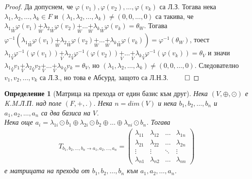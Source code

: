 \documentclass[12pt]{article}
\newtheorem{definition}{Определение}%
\begin{document}
\begin{proof}
Да допуснем, че \(\varphi(v_1), \varphi(v_2), \dots, \varphi(v_k)\) са Л.З.
Тогава нека \(\lambda_1, \lambda_2, \dots, \lambda_k \in F\) и \((\lambda_1, \lambda_2, \dots, \lambda_k) \neq (0, 0, \dots, 0)\)
са такива, че \(\lambda_1 \underset{W}{.} \varphi(v_1) \underset{W}{+} \lambda_2 \underset{W}{.} \varphi(v_2) \underset{W}{+} \dots \underset{W}{+} \lambda_k \underset{W}{.} \varphi(v_k) = \theta_W\).
Тогава \(\varphi^{-1}(\lambda_1 \underset{W}{.} \varphi(v_1) \underset{W}{+} \lambda_2 \underset{W}{.} \varphi(v_2) \underset{W}{+} \dots \underset{W}{+} \lambda_k \underset{W}{.} \varphi(v_k)) = \varphi^{-1}(\theta_W)\),
тоест \(\lambda_1 \underset{V}{.} \varphi^{-1}(\varphi(v_1)) \underset{V}{+} \lambda_2 \underset{V}{.} \varphi^{-1}(\varphi(v_2)) \underset{V}{+} \dots \underset{V}{+} \lambda_k \underset{V}{.} \varphi^{-1}(\varphi(v_k)) = \theta_V\)
и значи \(\lambda_1 \underset{V}{.} v_1 \underset{V}{+} \lambda_2 \underset{V}{.} v_2 \underset{V}{+} \dots \underset{V}{+} \lambda_k \underset{V}{.} v_k = \theta_V\),
но \((\lambda_1, \lambda_2, \dots, \lambda_k) \neq (0, 0, \dots, 0)\).
Следователно \(v_1, v_2, \dots, v_k\) са Л.З., но това е Абсурд, защото са Л.Н.З. \(\qed\)
\end{proof}

\begin{definition}[Матрица на прехода от един базис към друг]
Нека \((V, \oplus, \odot)\) е K.M.Л.П. над поле \((F, +, .)\).
Нека \(n = dim(V)\) и нека
\(b_1, b_2, \dots, b_n\) и \(a_1, a_2, \dots, a_n\) са два базиса на \(V\). \\
Нека още \(a_i = \lambda_{1i} \odot b_1 \oplus \lambda_{2i} \odot b_2 \oplus \dots \oplus \lambda_{ni} \odot b_n\).
Тогава
\begin{align*}
T_{b_1, b_2, \dots, b_n \to a_1, a_2, \dots, a_n}
=
\begin{pmatrix}
    \lambda_{11} & \lambda_{12} & \dots & \lambda_{1n} \\
    \lambda_{21} & \lambda_{22} & \dots & \lambda_{2n} \\
    \vdots    & \vdots  & \ddots & \vdots \\
    \lambda_{n1} & \lambda_{n2} & \dots & \lambda_{nn}
\end{pmatrix}
\end{align*}
е матрицата на прехода от \(b_1, b_2, \dots, b_n\) към \(a_1, a_2, \dots, a_n\).
\end{definition}
\end{document}

